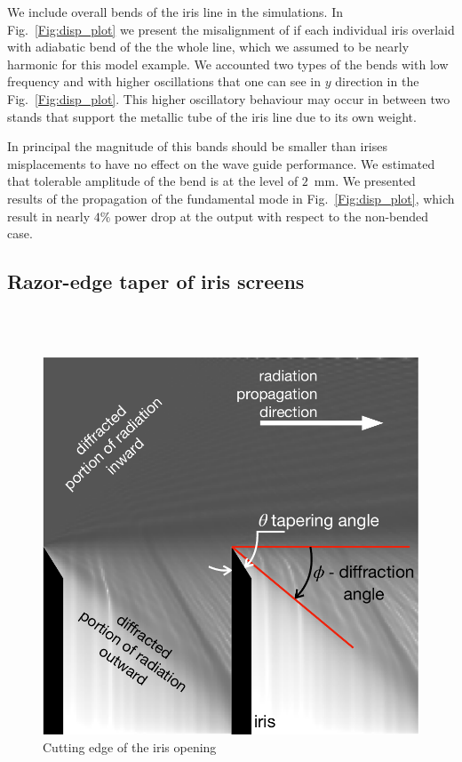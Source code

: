     We include overall bends of the iris line in the simulations. In Fig.~\ref{Fig:disp_plot} we present the misalignment of if each individual iris overlaid with adiabatic bend of the the whole line, which we assumed to be nearly harmonic for this model example. We accounted two types of the bends with low frequency and with higher oscillations that one can see in $y$ direction in the Fig.~\ref{Fig:disp_plot}. This higher oscillatory behaviour may occur in between two stands that support the metallic tube of the iris line due to its own weight. 
    
    In principal the magnitude of this bands should be smaller than irises misplacements to have no effect on the wave guide performance. We estimated that tolerable amplitude of the bend is at the level of $2$~mm. We presented results of the propagation of the fundamental mode in Fig.~\ref{Fig:disp_plot}, which result in nearly $4 \%$ power drop at the output with respect to the non-bended case.
    
    \subsection{Razor-edge taper of iris screens}
    \\
    \\
    \begin{figure}[h!]
    	\centering
    		\includegraphics[trim={0 0cm 0 0cm}, width=0.45\linewidth]{content/images/transport/cutting_edge.pdf}
    		\centering
            \captionsetup{justification=centering}
        	\caption{Cutting edge of the iris opening}
        \label{Fig:cutting_edge}
    \end{figure}
    
